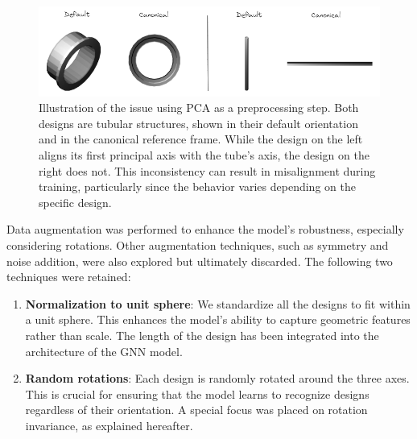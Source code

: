 \begin{figure}[h]
    \centering
    \includegraphics[width=\columnwidth]{images/pca_problem.png}
    \caption{Illustration of the issue using PCA as a preprocessing step. Both designs are tubular structures, shown in their default orientation and in the canonical reference frame. While the design on the left aligns its first principal axis with the tube's axis, the design on the right does not. This inconsistency can result in misalignment during training, particularly since the behavior varies depending on the specific design.}
    \label{fig:pca_problem}
\end{figure}

Data augmentation was performed to enhance the model's robustness, especially considering rotations. Other augmentation techniques, such as symmetry and noise addition, were also explored but ultimately discarded. The following two techniques were retained:
\begin{enumerate}
    \item \textbf{Normalization to unit sphere}: We standardize all the designs to fit within a unit sphere. This enhances the model's ability to capture geometric features rather than scale. The length of the design has been integrated into the architecture of the GNN model.
    \item \textbf{Random rotations}: Each design is randomly rotated around the three axes. This is crucial for ensuring that the model learns to recognize designs regardless of their orientation. A special focus was placed on rotation invariance, as explained hereafter.
\end{enumerate}

